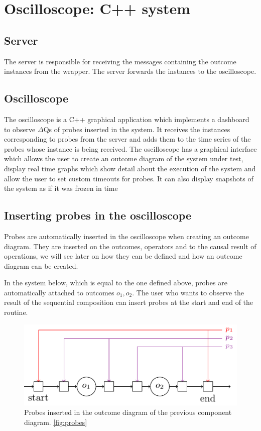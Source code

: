 \section{Oscilloscope: C++ system}
    \subsection{Server} The server is responsible for receiving the messages containing the outcome instances from the wrapper. The server forwards the instances to the oscilloscope.
    
    \subsection{Oscilloscope} The oscilloscope is a C++ graphical application which implements a dashboard to observe $\Delta$Qs of probes inserted in the system. It receives the instances corresponding to probes from the server and adds them to the time series of the probes whose instance is being received. 
    The oscilloscope has a graphical interface which allows the user to create an outcome diagram of the system under test, display real time graphs which show detail about the execution of the system and allow the user to set custom timeouts for probes. It can also display snapshots of the system as if it was frozen in time 

    \subsection{Inserting probes in the oscilloscope}
        Probes are automatically inserted in the oscilloscope when creating an outcome diagram. They are inserted on the outcomes, operators and to the causal result of operations, we will see later on how they can be defined and how an outcome diagram can be created. 
        
        In the system below, which is equal to the one defined above, probes are automatically attached to outcomes $o_1, o_2$. The user who wants to observe the result of the sequential composition can insert probes at the start and end of the routine. 

        \begin{figure}[H]
            \begin{center}
                \includegraphics[scale=1.3]{tikz/probe_1.pdf}
            \end{center}
            \label{fig:probes_o}
            \caption{Probes inserted in the outcome diagram of the previous component diagram. \cref{fig:probes}}
        \end{figure}
       
